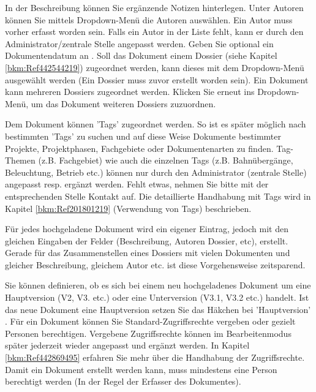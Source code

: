 \vspace{\baselineskip}

In der Beschreibung  können Sie ergänzende Notizen hinterlegen. Unter Autoren  können Sie mittels Dropdown-Menü die Autoren auswählen. Ein Autor muss vorher erfasst worden sein. Falls ein Autor in der Liste fehlt, kann er durch den Administrator/zentrale Stelle angepasst werden. Geben Sie optional ein Dokumentendatum an . Soll das Dokument einem Dossier (siehe Kapitel \ref{bkm:Ref442544219}) zugeordnet werden, kann dieses mit dem Dropdown-Menü  ausgewählt werden (Ein Dossier muss zuvor erstellt worden sein). Ein Dokument kann mehreren Dossiers zugeordnet werden. Klicken Sie erneut ins Dropdown-Menü, um das Dokument weiteren Dossiers zuzuordnen. \newline

Dem Dokument können 'Tags'  zugeordnet werden. So ist es später möglich nach bestimmten 'Tags' zu suchen und auf diese Weise Dokumente bestimmter Projekte, Projektphasen, Fachgebiete oder Dokumentenarten zu finden. Tag-Themen (z.B. Fachgebiet) wie auch die einzelnen Tags (z.B. Bahnübergänge, Beleuchtung, Betrieb etc.) können nur durch den Administrator (zentrale Stelle) angepasst resp. ergänzt werden. Fehlt etwas, nehmen Sie bitte mit der entsprechenden Stelle Kontakt auf. Die detaillierte Handhabung mit Tags wird in Kapitel \ref{bkm:Ref201801219} (Verwendung von Tags) beschrieben. \newline

Für jedes hochgeladene Dokument wird ein eigener Eintrag, jedoch mit den gleichen Eingaben der Felder (Beschreibung, Autoren Dossier, etc), erstellt. Gerade für das Zusammenstellen eines Dossiers mit vielen Dokumenten und gleicher Beschreibung, gleichem Autor etc. ist diese Vorgehensweise zeitsparend. 


Sie können definieren, ob es sich bei einem neu hochgeladenes Dokument um eine Hauptversion (V2, V3. etc.) oder eine Unterversion (V3.1, V3.2 etc.) handelt. Ist das neue Dokument eine Hauptversion setzen Sie das Häkchen bei 'Hauptversion' . Für ein Dokument können Sie Standard-Zugriffsrechte vergeben  oder gezielt Personen berechtigen. Vergebene Zugriffsrechte können im Bearbeitenmodus später jederzeit wieder angepasst und ergänzt werden. In Kapitel \ref{bkm:Ref442869495} erfahren Sie mehr über die Handhabung der Zugriffsrechte. Damit ein Dokument erstellt werden kann, muss mindestens eine Person berechtigt werden (In der Regel der Erfasser des Dokumentes).


